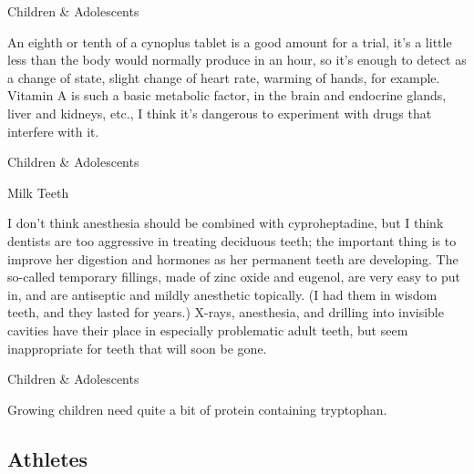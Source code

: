 \documentclass[11pt,oneside,openany,extrafontsizes]{memoir}
\begin{document}
\begin{standalonequote}{Children \& Adolescents}

    \begin{answer}
        An eighth or tenth of a cynoplus tablet is a good amount for a trial, it's a little less than the body would normally produce in an hour, so it's enough to detect as a change of state, slight change of heart rate, warming of hands, for example. Vitamin A is such a basic metabolic factor, in the brain and endocrine glands, liver and kidneys, etc., I think it's dangerous to experiment with drugs that interfere with it.
    \end{answer}
\end{standalonequote}

\begin{standalonequote}{Children \& Adolescents}
    \begin{note}
        Milk Teeth
    \end{note}

    \begin{answer}
        I don't think anesthesia should be combined with cyproheptadine, but I think dentists are too aggressive in treating deciduous teeth; the important thing is to improve her digestion and hormones as her permanent teeth are developing. The so-called temporary fillings, made of zinc oxide and eugenol, are very easy to put in, and are antiseptic and mildly anesthetic topically. (I had them in wisdom teeth, and they lasted for years.) X-rays, anesthesia, and drilling into invisible cavities have their place in especially problematic adult teeth, but seem inappropriate for teeth that will soon be gone.
    \end{answer}
\end{standalonequote}

\begin{standalonequote}{Children \& Adolescents}

    \begin{answer}
      Growing children need quite a bit of protein containing tryptophan.
    \end{answer}
\end{standalonequote}

\subsection{Athletes}
\end{document}
